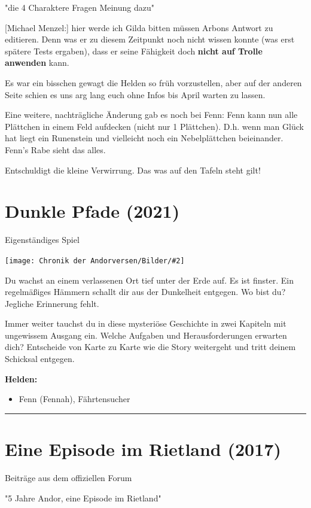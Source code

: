 \documentclass[10pt, a4paper, oneside]{book}
\newcommand{\fillbreak}{\vspace*{\fill}\columnbreak}
\newcommand{\produkt}[1]{%
    \section{#1}%
    \label{Produkt: #1}%
}
\newcommand{\storytext}[1]{%
    \section{#1}%
    \label{Storytext: #1}%
}
\newcommand{\bildmitts}[2][height=0.32\textwidth,width=0.48\textwidth,keepaspectratio]{%
    \begin{center}
        \texttt{[image: Chronik der Andorversen/Bilder/\#2]}
    \end{center}
}
\begin{document}
\begin{multicols}{2}
\begin{center} 
    "die 4 Charaktere Fragen Meinung dazu"
\end{center}

[Michael Menzel:] hier werde ich Gilda bitten müssen Arbons Antwort zu editieren. Denn was er zu diesem Zeitpunkt noch nicht wissen konnte (was erst spätere Tests ergaben), dass er seine Fähigkeit doch \textbf{nicht auf Trolle anwenden} kann.

Es war ein bisschen gewagt die Helden so früh vorzustellen, aber auf der anderen Seite schien es uns arg lang euch ohne Infos bis April warten zu lassen.

Eine weitere, nachträgliche Änderung gab es noch bei Fenn:
Fenn kann nun alle Plättchen in einem Feld aufdecken (nicht nur 1 Plättchen). D.h. wenn man Glück hat liegt ein Runenstein und vielleicht noch ein Nebelplättchen beieinander. Fenn's Rabe sieht das alles.

Entschuldigt die kleine Verwirrung. Das was auf den Tafeln steht gilt!


\fillbreak
\produkt{Dunkle Pfade (2021)}

\begin{center} 
    Eigenständiges Spiel
\end{center}

\bildmitts{Dunkle Pfade (2021).png}

Du wachst an einem verlassenen Ort tief unter der Erde auf. Es ist finster. Ein regelmäßiges Hämmern schallt dir aus der Dunkelheit entgegen. Wo bist du? Jegliche Erinnerung fehlt.

Immer weiter tauchst du in diese mysteriöse Geschichte in zwei Kapiteln mit ungewissem Ausgang ein. Welche Aufgaben und Herausforderungen erwarten dich? Entscheide von Karte zu Karte wie die Story weitergeht und tritt deinem Schicksal entgegen.\bigskip

\textbf{Helden:} 

\begin{itemize}[topsep=0pt,itemsep=-1ex,partopsep=1ex,parsep=1ex]
    \item Fenn (Fennah), Fährtensucher
\end{itemize}


\end{multicols}


\hrule

\storytext{Eine Episode im Rietland (2017)}

\begin{center}
    Beiträge aus dem offiziellen Forum

    "5 Jahre Andor, eine Episode im Rietland"
\end{center}
\end{document}
